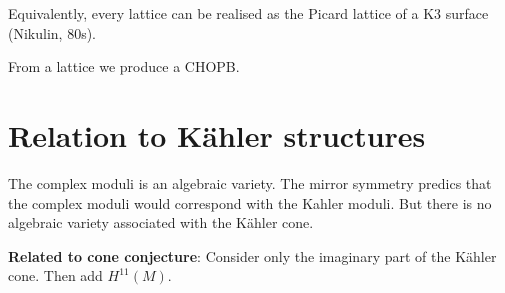 Equivalently, every lattice can be realised as the Picard lattice of a K3 surface (Nikulin, 80s).

\begin{upshot}\leavevmode
	From a lattice we produce a CHOPB.
\end{upshot}


\section{Relation to Kähler structures}

The complex moduli is an algebraic variety. The mirror symmetry predics that the complex moduli would correspond with the Kahler moduli. But there is no algebraic variety associated with the Kähler cone.

\textbf{Related to cone conjecture}: Consider only the imaginary part of the Kähler cone. Then add $ H^{11}(M)$. 





